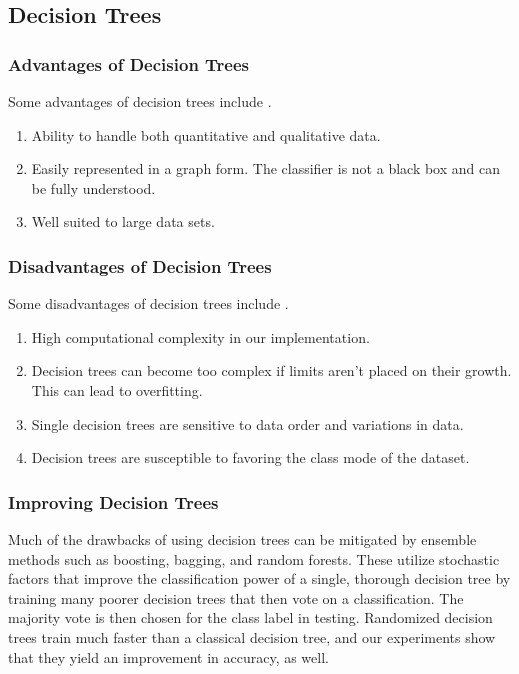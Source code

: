 \subsection{Decision Trees}
\subsubsection{Advantages of Decision Trees}

Some advantages of decision trees include \cite{scikit:decisiontrees}.
%
\begin{enumerate}
\item Ability to handle both quantitative and qualitative data.
\item Easily represented in a graph form. The classifier is not a black box and can be fully understood.
\item Well suited to large data sets.
\end{enumerate}

\subsubsection{Disadvantages of Decision Trees}

Some disadvantages of decision trees include \cite{scikit:decisiontrees}.
%
\begin{enumerate}
\item High computational complexity in our implementation. 
\item Decision trees can become too complex if limits aren't placed on their growth. This can lead to overfitting.
\item Single decision trees are sensitive to data order and variations in data.
\item Decision trees are susceptible to favoring the class mode of the dataset.
\end{enumerate}

\subsubsection{Improving Decision Trees}

Much of the drawbacks of using decision trees can be mitigated by ensemble methods such as boosting, bagging, and random forests. These utilize stochastic factors that improve the classification power of a single, thorough decision tree by training many poorer decision trees that then vote on a classification. The majority vote is then chosen for the class label in testing. Randomized decision trees train much faster than a classical decision tree, and our experiments show that they yield an improvement in accuracy, as well.

